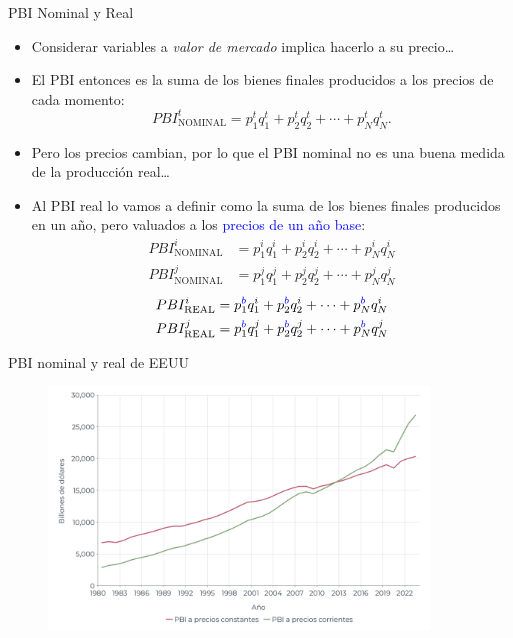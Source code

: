 \documentclass{beamer}
\begin{document}
\begin{frame}{PBI Nominal y Real}
    \begin{itemize}
        \item Considerar variables a \textit{valor de mercado} implica hacerlo a su precio\dots
        \item El PBI entonces es la suma de los bienes finales producidos a los precios de cada momento:
        \begin{equation*}
            PBI_{\text{NOMINAL}}^t = p_1^t q_1^t + p_2^t q_2^t + \cdots + p_N^t q_N^t.
        \end{equation*}
        \item Pero los precios cambian, por lo que el PBI nominal no es una buena medida de la producción real\dots
        \item Al PBI real lo vamos a definir como la suma de los bienes finales producidos en un año, pero valuados a los {\textcolor{blue}{precios de un año base}}:
        \begin{align*}
            PBI_{\text{NOMINAL}}^i &= p_1^i q_1^i + p_2^i q_2^i + \cdots + p_N^i q_N^i \\
            PBI_{\text{NOMINAL}}^j &= p_1^j q_1^j + p_2^j q_2^j + \cdots + p_N^j q_N^j
        \end{align*}
        \begin{align*}
            PBI_{\text{REAL}}^i &= p_1^{\textcolor{blue}{b}} q_1^i + p_2^{\textcolor{blue}{b}} q_2^i + \cdots + p_N^{\textcolor{blue}{b}} q_N^i \\
            PBI_{\text{REAL}}^j &= p_1^{\textcolor{blue}{b}} q_1^j + p_2^{\textcolor{blue}{b}} q_2^j + \cdots + p_N^{\textcolor{blue}{b}} q_N^j
        \end{align*}
    \end{itemize}
\end{frame}


\begin{frame}{PBI nominal y real de EEUU}
    \begin{figure} [H]   \includegraphics[width=0.9\textwidth]{Slides Principios de Economia/Figures/29.8.pdf}
\end{figure}
\end{frame}
\end{document}
